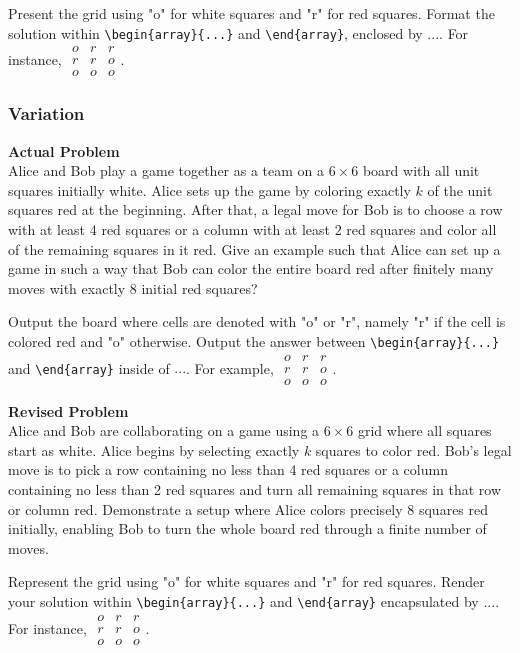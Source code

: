 Present the grid using "o" for white squares and "r" for red squares. Format the solution within \verb|\begin{array}{...}| and \verb|\end{array}|, enclosed by $\boxed{...}$. For instance, $\boxed{\begin{array}{ccc}o & r & r \\ r & r & o \\ o & o & o\end{array}}$.

\subsubsection{Variation}
\textbf{Actual Problem}\\
Alice and Bob play a game together as a team on a $6 \times 6$ board with all unit squares initially white. Alice sets up the game by coloring exactly $k$ of the unit squares red at the beginning. After that, a legal move for Bob is to choose a row with at least $4$ red squares or a column with at least $2$ red squares and color all of the remaining squares in it red. Give an example such that Alice can set up a game in such a way that Bob can color the entire board red after finitely many moves with exactly $8$ initial red squares?

Output the board where cells are denoted with "o" or "r", namely "r" if the cell is colored red and "o" otherwise. Output the answer between \verb|\begin{array}{...}| and \verb|\end{array}| inside of $\boxed{...}$. For example, $\boxed{\begin{array}{ccc}o & r & r \\ r & r & o \\ o & o & o\end{array}}$.

\textbf{Revised Problem}\\
Alice and Bob are collaborating on a game using a $6 \times 6$ grid where all squares start as white. Alice begins by selecting exactly $k$ squares to color red. Bob's legal move is to pick a row containing no less than 4 red squares or a column containing no less than 2 red squares and turn all remaining squares in that row or column red. Demonstrate a setup where Alice colors precisely 8 squares red initially, enabling Bob to turn the whole board red through a finite number of moves.

Represent the grid using "o" for white squares and "r" for red squares. Render your solution within \verb|\begin{array}{...}| and \verb|\end{array}| encapsulated by $\boxed{...}$. For instance, $\boxed{\begin{array}{ccc}o & r & r \\ r & r & o \\ o & o & o\end{array}}$.

